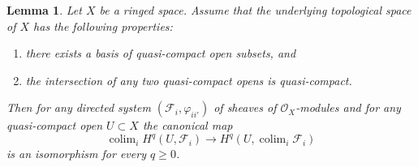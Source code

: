 \documentclass{amsart}
\theoremstyle{plain}
\newtheorem{lemma}[subsection]{Lemma}
\theoremstyle{definition}
\theoremstyle{remark}
\numberwithin{equation}{subsection}
\def\colim{\mathop{\mathrm{colim}}\nolimits}
\begin{document}
\begin{lemma}
\label{lemma-quasi-separated-cohomology-colimit}
Let $X$ be a ringed space. Assume that the underlying topological space
of $X$ has the following properties:
\begin{enumerate}
\item there exists a basis of quasi-compact open subsets, and
\item the intersection of any two quasi-compact opens is quasi-compact.
\end{enumerate}
Then for any directed system $(\mathcal{F}_i, \varphi_{ii'})$
of sheaves of $\mathcal{O}_X$-modules and for any quasi-compact open
$U \subset X$ the canonical map
$$
\colim_i H^q(U, \mathcal{F}_i)
\longrightarrow
H^q(U, \colim_i \mathcal{F}_i)
$$
is an isomorphism for every $q \geq 0$.
\end{lemma}
\end{document}

